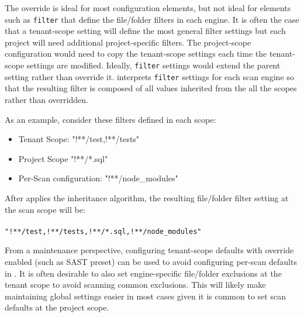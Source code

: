 The override is ideal for most configuration elements, but not ideal for elements
such as \texttt{filter} that define the file/folder filters in each engine.  It is often
the case that a tenant-scope setting will define the most general filter settings but
each project will need additional project-specific filters.  The project-scope
configuration would need to copy the tenant-scope settings each time the tenant-scope
settings are modified.  Ideally, \texttt{filter} settings would extend the parent
setting rather than override it. \cxoneflow interprets \texttt{filter} settings for each
scan engine so that the resulting filter is composed of all values inherited from 
the all the scopes rather than overridden.

As an example, consider these filters defined in each scope:

\begin{itemize}
    \item Tenant Scope: "!**/test,!**/tests"
    \item Project Scope "!**/*.sql"
    \item \cxoneflow Per-Scan configuration: "!**/node\_modules"
\end{itemize}

After \cxoneflow applies the inheritance algorithm, the resulting file/folder filter setting at the scan scope will be:
\\\\\texttt{"!**/test,!**/tests,!**/*.sql,!**/node\_modules"}


From a maintenance perspective, configuring tenant-scope defaults
with override enabled (such as SAST preset) can be used to avoid configuring
per-scan defaults in \cxoneflow.  It is often desirable to also set engine-specific
file/folder exclusions at the tenant scope to avoid scanning common exclusions.  
This will likely make maintaining global settings easier in most cases given
it is common to set scan defaults at the project scope.
